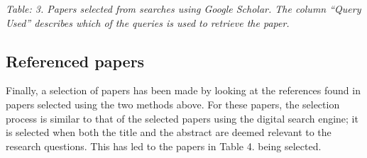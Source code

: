 \documentclass[]{book}
\begin{document}
\emph{Table: 3. Papers selected from searches using Google Scholar. The
column ``Query Used'' describes which of the queries is used to retrieve
the paper.}

\subsection{Referenced papers}\label{referenced-papers}

Finally, a selection of papers has been made by looking at the
references found in papers selected using the two methods above. For
these papers, the selection process is similar to that of the selected
papers using the digital search engine; it is selected when both the
title and the abstract are deemed relevant to the research questions.
This has led to the papers in Table 4. being selected.
\end{document}
